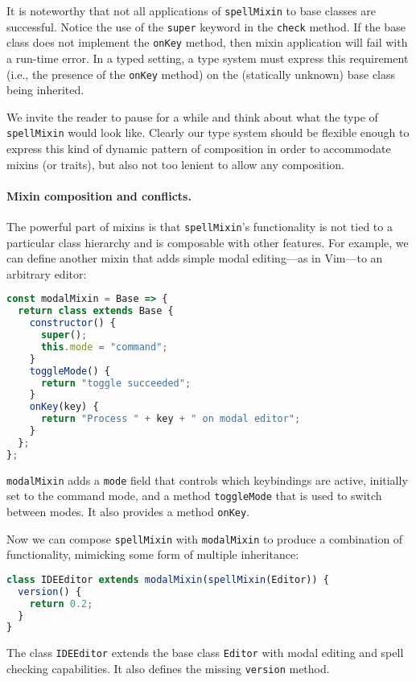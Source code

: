 It is noteworthy that not all applications of \lstinline{spellMixin} to base
classes are successful. Notice the use of the \lstinline{super} keyword in the
\lstinline{check} method. If the base class does not implement the
\lstinline{onKey} method, then mixin application will fail with a run-time error. In
a typed setting, a type system must express this requirement (i.e., the presence of
the \lstinline{onKey} method) on the (statically unknown) base class being inherited.




We invite the reader to pause for a while and think about what the type of
\lstinline{spellMixin} would look like. Clearly our type system should be
flexible enough to express this kind of dynamic pattern of composition in order
to accommodate mixins (or traits), but also not too lenient to allow any
composition.


\paragraph{Mixin composition and conflicts.}
The powerful part of mixins is that \lstinline{spellMixin}'s functionality is not
tied to a particular class hierarchy and is composable with other features. For
example, we can define another mixin that adds simple modal editing---as in Vim---to an arbitrary editor:
\begin{lstlisting}[language=JavaScript]
const modalMixin = Base => {
  return class extends Base {
    constructor() {
      super();
      this.mode = "command";
    }
    toggleMode() {
      return "toggle succeeded";
    }
    onKey(key) {
      return "Process " + key + " on modal editor";
    }
  };
};
\end{lstlisting}
\lstinline{modalMixin} adds a \lstinline{mode} field that controls which
keybindings are active, initially set to the command mode, and a method
\lstinline{toggleMode} that is used to switch between modes. It also provides a method \lstinline{onKey}.

Now we can compose \lstinline{spellMixin} with \lstinline{modalMixin} to produce
a combination of functionality, mimicking some form of multiple inheritance:
\begin{lstlisting}[language=JavaScript]
class IDEEditor extends modalMixin(spellMixin(Editor)) {
  version() {
    return 0.2;
  }
}
\end{lstlisting}
The class \lstinline{IDEEditor} extends the base class \lstinline{Editor} with
modal editing and spell checking capabilities. It also defines the missing
\lstinline{version} method.

